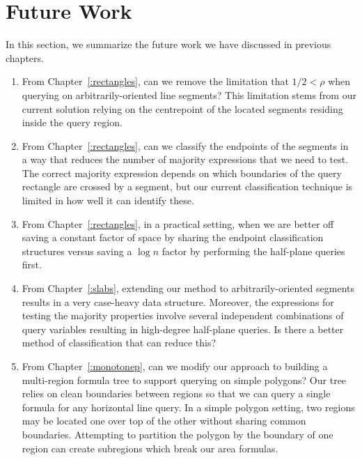 \section{Future Work}
\label{:conclusion:open-problems}

In this section, we summarize the future work we have discussed in previous chapters.

\begin{enumerate}
\item From Chapter~\ref{:rectangles}, can we remove the limitation that $1/2 < \rho$ when querying on arbitrarily-oriented line segments?  This limitation stems from our current solution relying on the centrepoint of the located segments residing inside the query region.

\item From Chapter~\ref{:rectangles}, can we classify the endpoints of the segments in a way that reduces the number of majority expressions that we need to test.  The correct majority expression depends on which boundaries of the query rectangle are crossed by a segment, but our current classification technique is limited in how well it can identify these.

\item From Chapter~\ref{:rectangles}, in a practical setting, when we are better off saving a constant factor of space by sharing the endpoint classification structures versus saving a $\log{n}$ factor by performing the half-plane queries first.

\item From Chapter~\ref{:slabs}, extending our method to arbitrarily-oriented segments results in a very case-heavy data structure. Moreover, the expressions for testing the majority properties involve several independent combinations of query variables resulting in high-degree half-plane queries. Is there a better method of classification that can reduce this?

\item From Chapter~\ref{:monotonep}, can we modify our approach to building a multi-region formula tree to support querying on simple polygons?  Our tree relies on clean boundaries between regions so that we can query a single formula for any horizontal line query. In a simple polygon setting, two regions may be located one over top of the other without sharing common boundaries.  Attempting to partition the polygon by the boundary of one region can create subregions which break our area formulas.

\end{enumerate}
